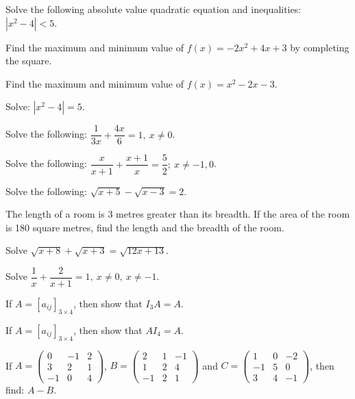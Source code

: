 \documentclass[11pt,a4paper]{article}
\begin{document}
\begin{shortlist}
\item Solve the following absolute value quadratic equation and inequalities: $|x^2-4|<5$.

\item Find the maximum and minimum value of $f(x)=-2x^2+4x+3$ by completing the square.

\item Find the maximum and minimum value of $f(x)=x^2-2x-3$.

\item Solve: $|x^2-4|=5$.

\item Solve the following: $\dfrac{1}{3x}+\dfrac{4x}{6}=1,\ x\neq 0$.

\item Solve the following: $\dfrac{x}{x+1}+\dfrac{x+1}{x}=\dfrac{5}{2};\ x\neq -1,0$.

\item Solve the following: $\sqrt{x+5}-\sqrt{x-3}=2$.

\item The length of a room is 3 metres greater than its breadth. If the area of the room is 180 square metres, find the length and the breadth of the room.

\item Solve $\sqrt{x+8}+\sqrt{x+3}=\sqrt{12x+13}$.

\item Solve $\dfrac{1}{x}+\dfrac{2}{x+1}=1,\ x\neq 0,\ x\neq -1$.

\item If $A=[a_{ij}]_{3\times 4}$, then show that $I_3A=A$.

\item If $A=[a_{ij}]_{3\times 4}$, then show that $AI_4=A$.

\item If $A=\begin{pmatrix}0 & -1 & 2\\ 3 & 2 & 1\\ -1 & 0 & 4\end{pmatrix}$, $B=\begin{pmatrix}2 & 1 & -1\\ 1 & 2 & 4\\ -1 & 2 & 1\end{pmatrix}$ and $C=\begin{pmatrix}1 & 0 & -2\\ -1 & 5 & 0\\ 3 & 4 & -1\end{pmatrix}$, then find: $A-B$.


\end{shortlist}
\end{document}
